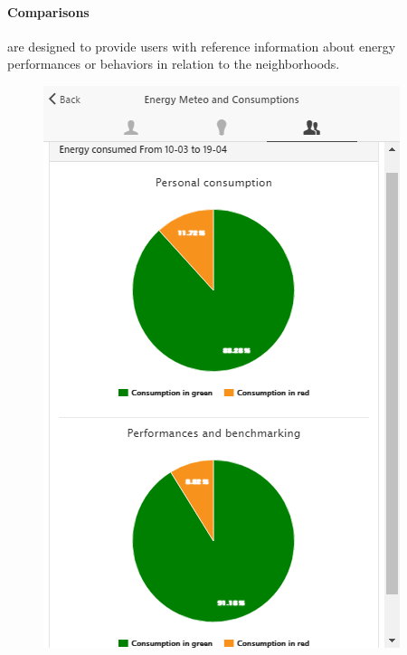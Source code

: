 \paragraph{Comparisons} are designed to provide users with reference information about energy performances or behaviors in relation to the neighborhoods.
\begin{figure}[htb]
      \begin{center}
        \begin{minipage}[htb]{0.33\linewidth}    
         \includegraphics[width=1\linewidth]{img/touperformancechart_indivcoll.png}
        \end{minipage}
         \begin{minipage}[htb]{0.33\linewidth}    

\end{minipage}
\end{center}
\end{figure}

